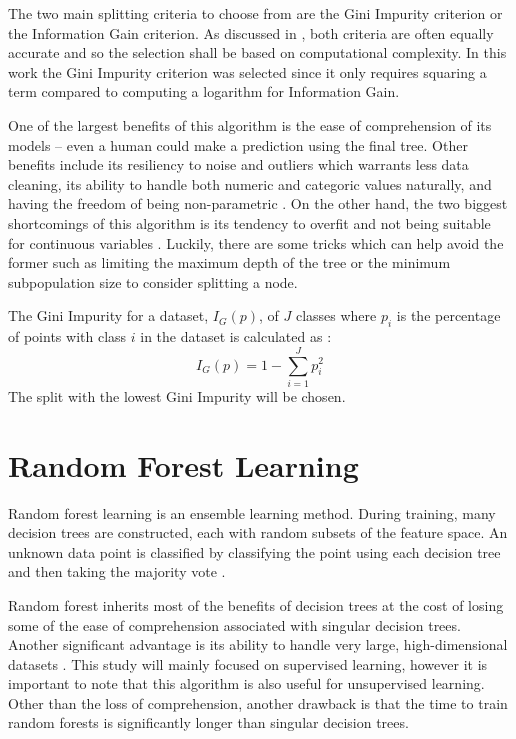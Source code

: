 The two main splitting criteria to choose from are the Gini Impurity criterion or the Information Gain criterion. As discussed in \cite{Gini-Index}, both criteria are often equally accurate and so the selection shall be based on computational complexity. In this work the Gini Impurity criterion was selected since it only requires squaring a term compared to computing a logarithm for Information Gain.

One of the largest benefits of this algorithm is the ease of comprehension of its models -- even a human could make a prediction using the final tree. Other benefits include its resiliency to noise and outliers \cite{DecisionTreeOG} which warrants less data cleaning, its ability to handle both numeric and categoric values naturally, and having the freedom of being non-parametric \cite{DecisionTreeNonPara}. On the other hand, the two biggest shortcomings of this algorithm is its tendency to overfit \cite{DecisionTreeOG} and not being suitable for continuous variables \cite{DecisionTreeOG}. Luckily, there are some tricks which can help avoid the former such as limiting the maximum depth of the tree or the minimum subpopulation size to consider splitting a node.

The Gini Impurity for a dataset, $I_G(p)$, of $J$ classes where $p_i$ is the percentage of points with class $i$ in the dataset is calculated as \cite{Gini-Index}:
$$I_G(p) = 1 - \sum\limits_{i=1}^J p_i^2$$
The split with the lowest Gini Impurity will be chosen.



\section{Random Forest Learning}
Random forest learning is an ensemble learning method. During training, many decision trees are constructed, each with random subsets of the feature space. An unknown data point is classified by classifying the point using each decision tree and then taking the majority vote \cite{RandomForestOG}.

Random forest inherits most of the benefits of decision trees at the cost of losing some of the ease of comprehension associated with singular decision trees. Another significant advantage is its ability to handle very large, high-dimensional datasets \cite{RandomForestHighDim}. This study will mainly focused on supervised learning, however it is important to note that this algorithm is also useful for unsupervised learning. Other than the loss of comprehension, another drawback is that the time to train random forests is significantly longer than singular decision trees.



